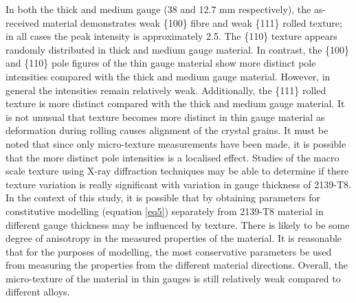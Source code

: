 	In both the thick and medium gauge (38 and 12.7 mm respectively), the as-received material demonstrates weak \{100\} fibre and weak \{111\} rolled texture; in all cases the peak intensity is approximately 2.5. The \{110\} texture appears randomly distributed in thick and medium gauge material. In contrast, the \{100\} and \{110\} pole figures of the thin gauge material show more distinct pole intensities compared with the thick and medium gauge material. However, in general the intensities remain relatively weak. Additionally, the \{111\} rolled texture is more distinct compared with the thick and medium gauge material. It is not unusual that texture becomes more distinct in thin gauge material as deformation during rolling causes alignment of the crystal grains. It must be noted that since only micro-texture measurements have been made, it is possible that the more distinct pole intensities is a localised effect. Studies of the macro scale texture using X-ray diffraction techniques may be able to determine if there texture variation is really significant with variation in gauge thickness of 2139-T8. In the context of this study, it is possible that by obtaining parameters for constitutive modelling (equation \ref{eq5}) separately from 2139-T8 material in different gauge thickness may be influenced by texture. There is likely to be some degree of anisotropy in the measured properties of the material. It is reasonable that for the purposes of modelling, the most conservative parameters be used from measuring the properties from the different material directions. Overall, the micro-texture of the material in thin gauges is still relatively weak compared to different alloys. 
